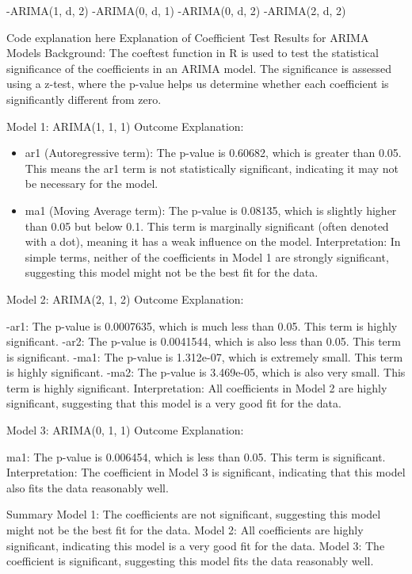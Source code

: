 \documentclass[
]{book}
\providecommand{\tightlist}{%
  \setlength{\itemsep}{0pt}\setlength{\parskip}{0pt}}
\begin{document}
-ARIMA(1, d, 2)
-ARIMA(0, d, 1)
-ARIMA(0, d, 2)
-ARIMA(2, d, 2)

Code explanation here
Explanation of Coefficient Test Results for ARIMA Models
Background: The coeftest function in R is used to test the statistical significance of the coefficients in an ARIMA model. The significance is assessed using a z-test, where the p-value helps us determine whether each coefficient is significantly different from zero.

Model 1: ARIMA(1, 1, 1)
Outcome Explanation:

\begin{itemize}
\tightlist
\item
  ar1 (Autoregressive term): The p-value is 0.60682, which is greater than 0.05. This means the ar1 term is not statistically significant, indicating it may not be necessary for the model.
\item
  ma1 (Moving Average term): The p-value is 0.08135, which is slightly higher than 0.05 but below 0.1. This term is marginally significant (often denoted with a dot), meaning it has a weak influence on the model.
  Interpretation: In simple terms, neither of the coefficients in Model 1 are strongly significant, suggesting this model might not be the best fit for the data.
\end{itemize}

Model 2: ARIMA(2, 1, 2)
Outcome Explanation:

-ar1: The p-value is 0.0007635, which is much less than 0.05. This term is highly significant.
-ar2: The p-value is 0.0041544, which is also less than 0.05. This term is significant.
-ma1: The p-value is 1.312e-07, which is extremely small. This term is highly significant.
-ma2: The p-value is 3.469e-05, which is also very small. This term is highly significant.
Interpretation: All coefficients in Model 2 are highly significant, suggesting that this model is a very good fit for the data.

Model 3: ARIMA(0, 1, 1)
Outcome Explanation:

ma1: The p-value is 0.006454, which is less than 0.05. This term is significant.
Interpretation: The coefficient in Model 3 is significant, indicating that this model also fits the data reasonably well.

Summary
Model 1: The coefficients are not significant, suggesting this model might not be the best fit for the data.
Model 2: All coefficients are highly significant, indicating this model is a very good fit for the data.
Model 3: The coefficient is significant, suggesting this model fits the data reasonably well.
\end{document}
